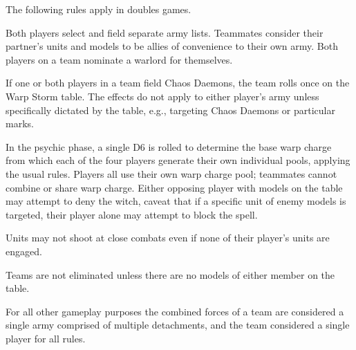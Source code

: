 
The following rules apply in doubles games.

Both players select and field separate army lists. Teammates consider
their partner's units and models to be allies of convenience to their
own army. Both players on a team nominate a warlord for themselves.

If one or both players in a team field Chaos Daemons, the team rolls
once on the Warp Storm table.  The effects do not apply to either
player's army unless specifically dictated by the table, e.g.,
targeting Chaos Daemons or particular marks.


In the psychic phase, a single D6 is rolled to determine the base warp
charge from which each of the four players generate their own
individual pools, applying the usual rules.  Players all use their own
warp charge pool; teammates cannot combine or share warp
charge. Either opposing player with models on the table may attempt to
deny the witch, caveat that if a specific unit of enemy models is
targeted, their player alone may attempt to block the spell.

Units may not shoot at close combats even if none of their player's
units are engaged.

Teams are not eliminated unless there are no models of either member
on the table.

For all other gameplay purposes the combined forces of a team are
considered a single army comprised of multiple detachments, and the
team considered a single player for all rules.

